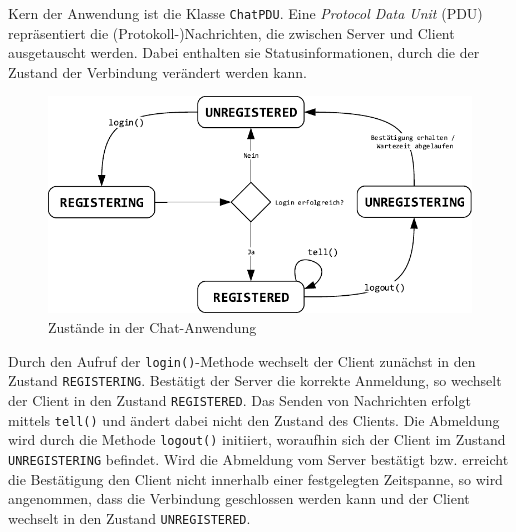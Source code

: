 \documentclass[11pt,a4paper,titlepage]{scrartcl}
\numberwithin{equation}{section}
\begin{document}
\noindent Kern der Anwendung ist die Klasse \texttt{ChatPDU}. Eine \textit{Protocol Data Unit} (PDU) repräsentiert die (Protokoll-)Nachrichten, die zwischen Server und Client ausgetauscht werden. Dabei enthalten sie Statusinformationen, durch die der Zustand der Verbindung verändert werden kann. 
\medskip
\begin{figure}[ht] 
	\begin{center}
		\includegraphics[scale=1]{img/DaKoZustand.pdf}
		\caption{Zustände in der Chat-Anwendung}
		\label{fig:dakoZustand}
	\end{center}
\end{figure}

\noindent Durch den Aufruf der \texttt{login()}-Methode wechselt der Client zunächst in den Zustand \texttt{REGISTERING}. Bestätigt der Server die korrekte Anmeldung, so wechselt der Client in den Zustand \texttt{REGISTERED}. Das Senden von Nachrichten erfolgt mittels \texttt{tell()} und ändert dabei nicht den Zustand des Clients. Die Abmeldung wird durch die Methode \texttt{logout()} initiiert, woraufhin sich der Client im Zustand \texttt{UNREGISTERING} befindet. Wird die Abmeldung vom Server bestätigt bzw. erreicht die Bestätigung den Client nicht innerhalb einer festgelegten Zeitspanne, so wird angenommen, dass die Verbindung geschlossen werden kann und der Client wechselt in den Zustand \texttt{UNREGISTERED}.\\
\end{document}
